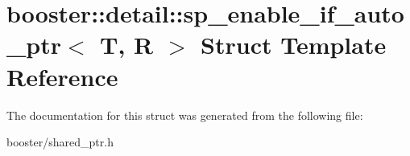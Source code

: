 \section{booster\+:\+:detail\+:\+:sp\+\_\+enable\+\_\+if\+\_\+auto\+\_\+ptr$<$ T, R $>$ Struct Template Reference}
\label{structbooster_1_1detail_1_1sp__enable__if__auto__ptr}


The documentation for this struct was generated from the following file\+:\begin{DoxyCompactItemize}
\item 
booster/shared\+\_\+ptr.\+h\end{DoxyCompactItemize}

